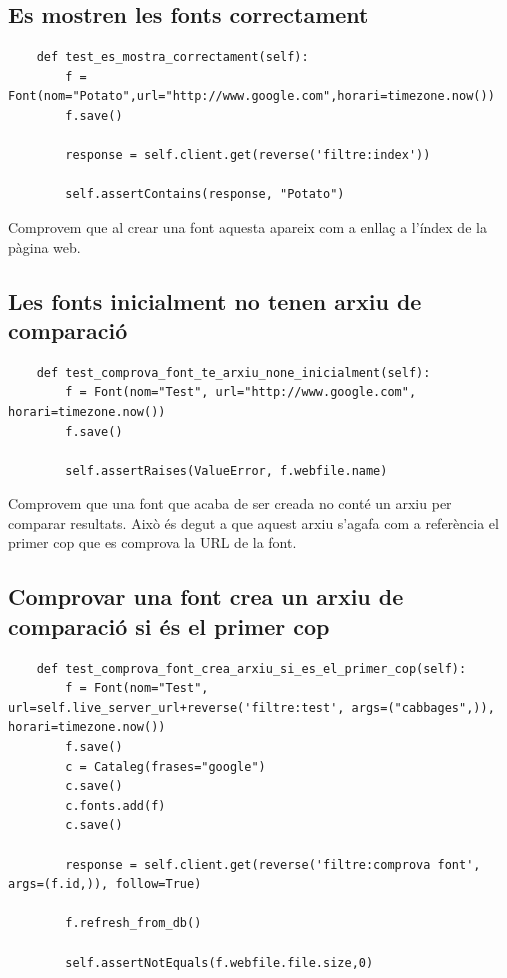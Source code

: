 \documentclass{article}
\begin{document}
\subsection{Es mostren les fonts correctament}

\begin{lstlisting}
    def test_es_mostra_correctament(self):
        f = Font(nom="Potato",url="http://www.google.com",horari=timezone.now())
        f.save()

        response = self.client.get(reverse('filtre:index'))

        self.assertContains(response, "Potato")
\end{lstlisting}

Comprovem que al crear una font aquesta apareix com a enllaç a l'índex de la pàgina web.

\subsection{Les fonts inicialment no tenen arxiu de comparació}

\begin{lstlisting}
    def test_comprova_font_te_arxiu_none_inicialment(self):
        f = Font(nom="Test", url="http://www.google.com", horari=timezone.now())
        f.save()

        self.assertRaises(ValueError, f.webfile.name)
\end{lstlisting}

Comprovem que una font que acaba de ser creada no conté un arxiu per comparar resultats. Això és degut a que aquest arxiu s'agafa com a referència el primer cop que es comprova la URL de la font.

\subsection{Comprovar una font crea un arxiu de comparació si és el primer cop}

\begin{lstlisting}
    def test_comprova_font_crea_arxiu_si_es_el_primer_cop(self):
        f = Font(nom="Test", url=self.live_server_url+reverse('filtre:test', args=("cabbages",)), horari=timezone.now())
        f.save()
        c = Cataleg(frases="google")
        c.save()
        c.fonts.add(f)
        c.save()

        response = self.client.get(reverse('filtre:comprova font', args=(f.id,)), follow=True)

        f.refresh_from_db()

        self.assertNotEquals(f.webfile.file.size,0)
\end{lstlisting}
\end{document}
